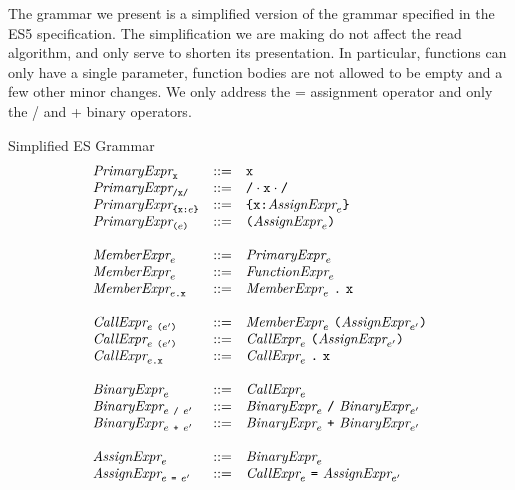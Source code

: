 \documentclass[onecolumn]{sigplanconf-onecolumn}
\begin{document}
The grammar we present is a simplified version of the grammar
specified in the ES5 specification. The simplification we are making
do not affect the read algorithm, and only serve to shorten its
presentation. In particular, functions can only have a single
parameter, function bodies are not allowed to be empty and a few other
minor changes. We only address the = assignment operator and only the
/ and + binary operators.

\begin{displayfigure*}{\label{fig:grammar}Simplified ES Grammar}
\[
\begin{array}{lcl}
  \textit{PrimaryExpr}_{\texttt{x}} &::=& \texttt{x} 
  \\
  \textit{PrimaryExpr}_{\texttt{/x/}} &::=& \texttt{/} \cdot \texttt{x} \cdot \texttt{/} 
  \\
  \textit{PrimaryExpr}_{\texttt{\{}\texttt{x} \texttt{:} e\texttt{\}}} &::=& 
  \texttt{\{}\texttt{x} \texttt{:} \textit{AssignExpr}_{e}\texttt{\}}
  \\
  \textit{PrimaryExpr}_{\texttt{(}e\texttt{)}} &::=& 
  \texttt{(}\textit{AssignExpr}_{e}\texttt{)}
  \\ \\
  \textit{MemberExpr}_{e} &::=&
  \textit{PrimaryExpr}_{e}
  \\
  \textit{MemberExpr}_{e} &::=&
  \textit{FunctionExpr}_{e}
  \\
  \textit{MemberExpr}_{e\texttt{.\texttt{x}}} &::=&
  \textit{MemberExpr}_{e}~\texttt{.}~\texttt{x}
  \\ \\
  \textit{CallExpr}_{e~\texttt{(}e'\texttt{)}} &::=& 
  \textit{MemberExpr}_{e}~
  \texttt{(}\textit{AssignExpr}_{e'}\texttt{)}
  \\
  \textit{CallExpr}_{e~\texttt{(}e'\texttt{)}} &::=& 
  \textit{CallExpr}_{e}~
  \texttt{(}\textit{AssignExpr}_{e'}\texttt{)}
  \\
  \textit{CallExpr}_{e\texttt{.\texttt{x}}} &::=& 
  \textit{CallExpr}_{e}~\texttt{.}~
  \texttt{x}
  \\ \\
  \textit{BinaryExpr}_{e} &::=& \textit{CallExpr}_{e} \\
  \textit{BinaryExpr}_{e ~\texttt{/}~ e'}
  &::=&
  \textit{BinaryExpr}_{e} ~\texttt{/}~ \textit{BinaryExpr}_{e'} \\
  \textit{BinaryExpr}_{e ~\texttt{+}~ e'}
  &::=&
  \textit{BinaryExpr}_{e} ~\texttt{+}~ \textit{BinaryExpr}_{e'}
  \\ \\
  \textit{AssignExpr}_{e} &::=&
  \textit{BinaryExpr}_{e}
  \\
  \textit{AssignExpr}_{e~\texttt{=}~e'} &::=&
  \textit{CallExpr}_{e}~\texttt{=}~
  \textit{AssignExpr}_{e'}
  \\ \\

\end{array}\]
\end{displayfigure*}
\end{document}
